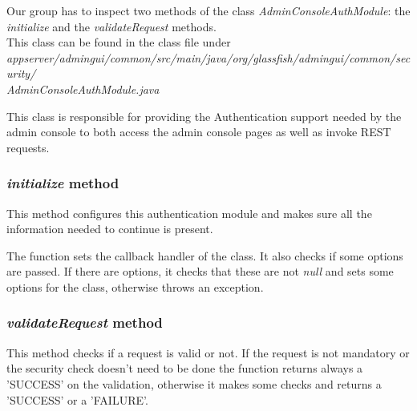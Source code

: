 Our group has to inspect two methods of the class \textit{AdminConsoleAuthModule}: the \textit{initialize} and the \textit{validateRequest} methods.\\
This class can be found in the class file under \textit{appserver/admingui/common/src/main/java/org/glassfish/admingui/common/security/\\AdminConsoleAuthModule.java}

This class is responsible for providing the Authentication support needed by the admin console to both access the admin console pages as well as invoke REST requests.

\subsubsection{\textit{initialize} method}
This method configures this authentication module and makes sure all the information needed to continue is present.

The function sets the callback handler of the class.
It also checks if some options are passed. If there are options, it checks that these are not \textit{null} and sets some options for the class, otherwise throws an exception.

\subsubsection{\textit{validateRequest} method}
This method checks if a request is valid or not. If the request is not mandatory or the security check doesn't need to be done the function returns always a 'SUCCESS' on  the validation, otherwise it makes some checks and returns a 'SUCCESS' or a 'FAILURE'.